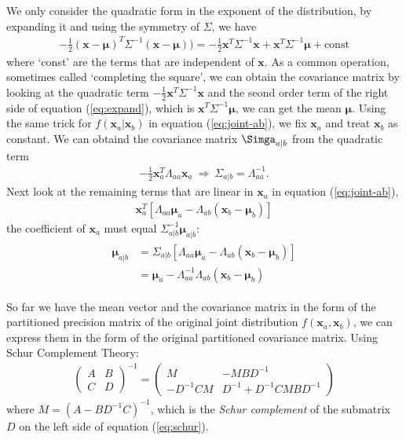 {We only consider the quadratic form in the exponent of the distribution, by expanding it and using the symmetry of $\Sigma$, we have
\begin{align}
-\frac{1}{2}(\mathbf{x}-\mathbf{\mu})^T\Sigma^{-1}(\mathbf{x}-\mathbf{\mu}))=-\frac{1}{2}\mathbf{x}^T\Sigma^{-1}\mathbf{x}+\mathbf{x}^T\Sigma^{-1}\mathbf{\mu}+\text{const}
\label{eq:expand}
\end{align}
where `const' are the terms that are independent of $\mathbf{x}$. As a common operation, sometimes called `completing the square', we can obtain the covariance matrix by looking at the quadratic term $-\frac{1}{2}\mathbf{x}^T\Sigma^{-1}\mathbf{x}$ and the seond order term of the right side of equation (\ref{eq:expand}), which is $\mathbf{x}^T\Sigma^{-1}\mathbf{\mu}$, we can get the mean $\mathbf{\mu}$. 
Using the same trick for $f(\mathbf{x}_a|\mathbf{x}_b)$ in equation (\ref{eq:joint-ab}), we fix $\mathbf{x}_a$ and treat $\mathbf{x}_b$ as constant. We can obtaind the covariance matrix $\Simga_{a|b}$ from the quadratic term  
\begin{align}
-\frac{1}{2}\mathbf{x}_a^{T}\Lambda_{aa}\mathbf{x}_a\:\Rightarrow\:\Sigma_{a|b}=\Lambda_{aa}^{-1}.
\label{eq:cov}
\end{align}
Next look at the remaining terms that are linear in $\mathbf{x}_a$ in equation (\ref{eq:joint-ab}), 
\begin{align}
\mathbf{x}_a^{T}[\Lambda_{aa}\mathbf{\mu}_a-\Lambda_{ab}(\mathbf{x}_b-\mathbf{\mu}_b)]
\end{align}
the coefficient of $\mathbf{x}_a$ must equal $\Sigma_{a|b}^{-1}\mathbf{\mu}_{a|b}$:
\begin{align}
\begin{split}
\mathbf{\mu}_{a|b} & =\Sigma_{a|b}[\Lambda_{aa}\mathbf{\mu}_a-\Lambda_{ab}(\mathbf{x}_b-\mathbf{\mu}_b)] \\
& =\mathbf{\mu}_a-\Lambda_{aa}^{-1}\Lambda_{ab}(\mathbf{x}_b-\mathbf{\mu}_b)
\end{split}
\label{eq:mean}
\end{align}

So far we have the mean vector and the covariance matrix in the form of the partitioned precision matrix of the original joint distribution $f(\mathbf{x}_a, \mathbf{x}_b)$, we can express them in the form of the original partitioned covariance matrix.
Using Schur Complement Theory:
\begin{align}
\begin{pmatrix} 
A & B \\
C & D 
\end{pmatrix}^{-1}
=\begin{pmatrix} 
M & -MBD^{-1} \\
-D^{-1}CM & D^{-1}+D^{-1}CMBD^{-1} 
\end{pmatrix}
\label{eq:schur}
\end{align}
where $M = (A-BD^{-1}C)^{-1}$, which is the \emph{Schur complement} of the submatrix $D$ on the left side of equation (\ref{eq:schur}).

}
